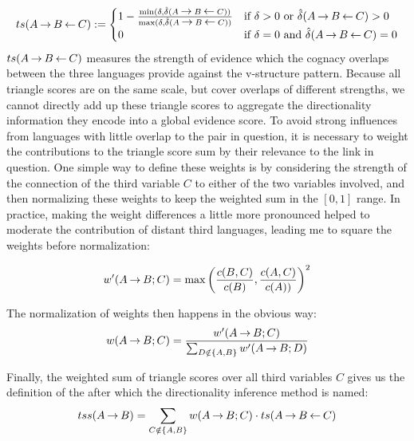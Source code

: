 \begin{equation*}
   ts(A \kern 2pt\hbox{$\rightarrow$}\kern 2pt B \kern 2pt\hbox{$\leftarrow$}\kern 2pt C ) :=
   \begin{cases}
     1 - \frac{\min(\delta,\hat{\delta}(A \kern 2pt\hbox{$\rightarrow$}\kern 2pt B \kern 2pt\hbox{$\leftarrow$}\kern 2pt C))}{\max(\delta,\hat{\delta}(A \kern 2pt\hbox{$\rightarrow$}\kern 2pt B \kern 2pt\hbox{$\leftarrow$}\kern 2pt C))} & \text{if } \delta > 0 \text{ or } \hat{\delta}(A \kern 2pt\hbox{$\rightarrow$}\kern 2pt B \kern 2pt\hbox{$\leftarrow$}\kern 2pt C) > 0\\
     0 & \text{if } \delta = 0 \text{ and } \hat{\delta}(A \kern 2pt\hbox{$\rightarrow$}\kern 2pt B \kern 2pt\hbox{$\leftarrow$}\kern 2pt C) = 0
   \end{cases}
\end{equation*}
\linebreak
$ts(A \kern 2pt\hbox{$\rightarrow$}\kern 2pt B \kern 2pt\hbox{$\leftarrow$}\kern 2pt C)$ measures the strength of evidence which the cognacy overlaps between the three languages provide against the v-structure pattern. Because all triangle scores are on the same scale, but cover overlaps of different strengths, we cannot directly add up these triangle scores to aggregate the directionality information they encode into a global evidence score. To avoid strong influences from languages with little overlap to the pair in question, it is necessary to weight the contributions to the triangle score sum by their relevance to the link in question. One simple way to define these weights is by considering the strength of the connection of the third variable $C$ to either of the two variables involved, and then normalizing these weights to keep the weighted sum in the $[0,1]$ range. In practice, making the weight differences a little more pronounced helped to moderate the contribution of distant third languages, leading me to square the weights before normalization:

\begin{equation*}
 w'(A \kern 2pt\hbox{$\rightarrow$}\kern 2pt B; C) = \max\left(\frac{c(B,C)}{c(B)},\frac{c(A,C)}{c(A))}\right)^2
\end{equation*}

The normalization of weights then happens in the obvious way:
\begin{equation*}
 w(A \kern 2pt\hbox{$\rightarrow$}\kern 2pt B; C) = \frac{w'(A \kern 2pt\hbox{$\rightarrow$}\kern 2pt B; C)}{\sum_{D \notin\{A,B\}} w'(A \kern 2pt\hbox{$\rightarrow$}\kern 2pt B; D)}
\end{equation*}

Finally, the weighted sum of triangle scores over all third variables $C$ gives us the definition of the \textit{} after which the directionality inference method is named: 
\begin{equation*}
 tss(A \kern 2pt\hbox{$\rightarrow$}\kern 2pt B) = \sum_{C \notin\{A,B\}} w(A \kern 2pt\hbox{$\rightarrow$}\kern 2pt B; C) \cdot ts(A \kern 2pt\hbox{$\rightarrow$}\kern 2pt B \kern 2pt\hbox{$\leftarrow$}\kern 2pt C)
\end{equation*}

